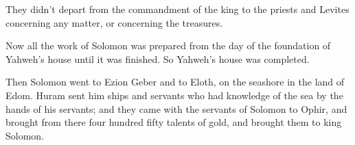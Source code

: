 {They didn’t depart from the commandment of the king to the priests and Levites concerning any matter, or concerning the treasures.
\par }{\PP {}Now all the work of Solomon was prepared from the day of the foundation of Yahweh’s house until it was finished. So Yahweh’s house was completed.
\par }{\PP {}Then Solomon went to Ezion Geber and to Eloth, on the seashore in the land of Edom.
Huram sent him ships and servants who had knowledge of the sea by the hands of his servants; and they came with the servants of Solomon to Ophir, and brought from there four hundred fifty talents of gold, and brought them to king Solomon.

}
